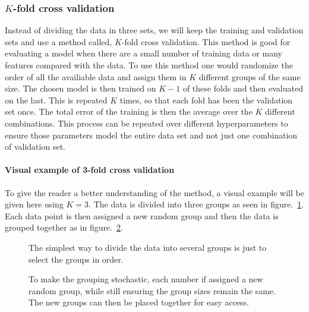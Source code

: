 \subsubsection{$K$-fold cross validation}

Instead of dividing the data in three sets, we will keep the training and validation sets and use a method called, $K$-fold cross validation. This method is good for evaluating a model when there are a small number of training data or many features compared with the data. To use this method one would randomize the order of all the availiable data and assign them in $K$ different groups of the same size. The chosen model is then trained on $K-1$ of these folds and then evaluated on the last. This is repeated $K$ times, so that each fold has been the validation set once. The total error of the training is then the average over the $K$ different combinations. This process can be repeated over different hyperparameters to ensure those parameters model the entire data set and not just one combination of validation set.

\paragraph{Visual example of 3-fold cross validation}

To give the reader a better understanding of the method, a visual example will be given here using $K=3$. The data is divided into three groups as seen in figure.~\ref{fig:dartWheel}. Each data point is then assigned a new random group and then the data is grouped together as in figure.~\ref{fig:randomWheel}.

\begin{figure}[H]
\centering

\caption{\label{fig:dartWheel} The simplest way to divide the data into several groups is just to select the groups in order.}
\end{figure}

\begin{figure}[H]
\centering


\caption{\label{fig:randomWheel} To make the grouping stochastic, each number if assigned a new random group, while still ensuring the group sizes remain the same. The new groups can then be placed together for easy access.}
\end{figure}
